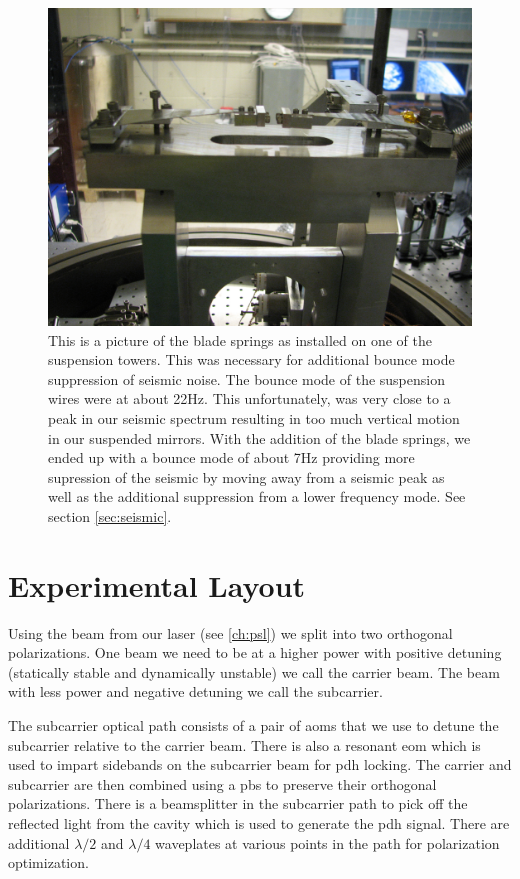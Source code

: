 \begin{figure}
\centering
  \includegraphics[width=15cm]{./figures/bladesprings.jpg}
  \caption[Blade Spring Modification for Veritcal Isolation]{
  This is a picture of the blade springs as installed on one of the suspension
  towers.
  This was necessary for additional bounce mode suppression of seismic noise.
  The bounce mode of the suspension wires were at about 22Hz.
  This unfortunately, was very close to a peak in our seismic spectrum
  resulting in too much vertical motion in our suspended mirrors.
  With the addition of the blade springs, we ended up with a bounce mode of
  about 7Hz providing more supression of the seismic by moving away from a
  seismic peak as well as the additional suppression from a lower frequency
  mode. See section \ref{sec:seismic}.
  }
  \label{fig:blades}
\end{figure}

\section{Experimental Layout}
Using the beam from our laser (see \ref{ch:psl}) we split into two orthogonal
polarizations. One beam we need to be at a higher power with positive detuning
(statically stable and dynamically unstable) we call the carrier beam. The
beam with less power and negative detuning we call the subcarrier.

The subcarrier optical path consists of a pair of \ac{aom}s that we use to
detune the subcarrier relative to the carrier beam.
There is also a resonant
\ac{eom} which is used to impart sidebands on the subcarrier beam for \ac{pdh}
locking.
The carrier and subcarrier are then combined using a \ac{pbs} to preserve their
orthogonal polarizations. There is a beamsplitter in the subcarrier path to pick
off the reflected light from the cavity which is used to generate the \ac{pdh}
signal. There are additional $\lambda/2$ and $\lambda/4$ waveplates at various
points in the path for polarization optimization.

